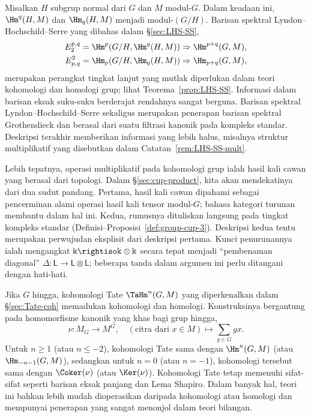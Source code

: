 Misalkan $H$ subgrup normal dari $G$ dan $M$ modul-$G$. Dalam keadaan ini,
$\Hm^q(H,M)$ dan $\Hm_q(H,M)$ menjadi modul-$(G/H)$. Barisan spektral
Lyndon--Hochschild--Serre yang dibahas dalam \S\ref{sec:LHS-SS},
\begin{align*}
	E_2^{p, q} = \Hm^p(G/H, \Hm^q(H, M)) & \Rightarrow \Hm^{p+q}(G, M), \\
	E^2_{p, q} = \Hm_p(G/H, \Hm_q(H, M)) & \Rightarrow \Hm_{p+q}(G, M),
\end{align*}
merupakan perangkat tingkat lanjut yang mutlak diperlukan dalam teori
kohomologi dan homologi grup; lihat Teorema~\ref{prop:LHS-SS}. Informasi dalam
barisan eksak suku-suku berderajat rendahnya sangat berguna. Barisan spektral
Lyndon--Hochschild--Serre sekaligus merupakan penerapan barisan spektral
Grothendieck dan berasal dari suatu filtrasi kanonik pada kompleks standar.
Deskripsi terakhir memberikan informasi yang lebih halus, misalnya struktur
multiplikatif yang disebutkan dalam Catatan~\ref{rem:LHS-SS-mult}.

Lebih tepatnya, operasi multiplikatif pada kohomologi grup ialah hasil kali
cawan yang berasal dari topologi. Dalam \S\ref{sec:cup-product}, kita akan
mendekatinya dari dua sudut pandang. Pertama, hasil kali cawan dipahami sebagai
pencerminan alami operasi hasil kali tensor modul-$G$; bahasa kategori turunan
membantu dalam hal ini. Kedua, rumusnya dituliskan langsung pada tingkat
kompleks standar (Definisi--Proposisi~\ref{def:group-cup-3}). Deskripsi kedua
tentu merupakan perwujudan eksplisit dari deskripsi pertama. Kunci penurunannya
ialah mengangkat $\Bbbk\rightiso\Bbbk\otimes\Bbbk$ secara tepat menjadi
``pembenaman diagonal''
$\Delta:\mathsf{L}\to\mathsf{L}\otimes\mathsf{L}$; beberapa tanda dalam
argumen ini perlu ditangani dengan hati-hati.

Jika $G$ hingga, kohomologi Tate $\TaHm^n(G,M)$ yang diperkenalkan dalam
\S\ref{sec:Tate-coh} memadukan kohomologi dan homologi. Konstruksinya bergantung
pada homomorfisme kanonik yang khas bagi grup hingga,
\[ \nu: M_G \to M^G, \quad (\text{citra dari }x \in M) \mapsto \sum_{g \in G} gx. \]
Untuk $n\geq1$ (atau $n\leq-2$), kohomologi Tate sama dengan $\Hm^n(G,M)$
(atau $\Hm_{-n-1}(G,M)$), sedangkan untuk $n=0$ (atau $n=-1$), kohomologi
tersebut sama dengan $\Coker(\nu)$ (atau $\Ker(\nu)$). Kohomologi Tate tetap
memenuhi sifat-sifat seperti barisan eksak panjang dan Lema Shapiro. Dalam
banyak hal, teori ini bahkan lebih mudah dioperasikan daripada kohomologi atau
homologi dan mempunyai penerapan yang sangat menonjol dalam teori bilangan.

